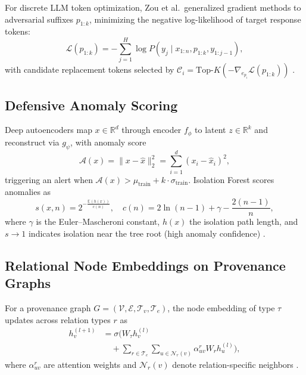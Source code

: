 \documentclass[conference,10pt,twocolumn,a4paper]{IEEEtran}
\begin{document}
For discrete LLM token optimization, Zou et al.\ generalized gradient methods to adversarial suffixes $p_{1:k}$, minimizing the negative log-likelihood of target response tokens:
\begin{equation}
\mathcal{L}(p_{1:k}) = -\sum_{j=1}^{H} \log P\left(y_j \mid x_{1:n}, p_{1:k}, y_{1:j-1}\right),
\end{equation}
with candidate replacement tokens selected by $\mathcal{C}_i = \mathrm{Top}\text{-}K(-\nabla_{e_{p_i}} \mathcal{L}(p_{1:k}))$ \cite{zou2023universal}.

\subsection{Defensive Anomaly Scoring}
Deep autoencoders map $x \in \mathbb{R}^d$ through encoder $f_\phi$ to latent $z \in \mathbb{R}^k$ and reconstruct via $g_\psi$, with anomaly score
\begin{equation}
\mathcal{A}(x) = \|x - \hat{x}\|_2^2 = \sum_{i=1}^{d} (x_i - \hat{x}_i)^2,
\end{equation}
triggering an alert when $\mathcal{A}(x) > \mu_{\mathrm{train}} + k \cdot \sigma_{\mathrm{train}}$. Isolation Forest scores anomalies as
\begin{equation}
s(x, n) = 2^{-\frac{\mathbb{E}(h(x))}{c(n)}}, \quad c(n) = 2\ln(n-1) + \gamma - \frac{2(n-1)}{n},
\end{equation}
where $\gamma$ is the Euler--Mascheroni constant, $h(x)$ the isolation path length, and $s \to 1$ indicates isolation near the tree root (high anomaly confidence) \cite{mirsky2018kitsune}.

\subsection{Relational Node Embeddings on Provenance Graphs}
For a provenance graph $G = (\mathcal{V}, \mathcal{E}, \mathcal{T}_v, \mathcal{T}_e)$, the node embedding of type $\tau$ updates across relation types $r$ as
\begin{equation}
\begin{split}
h_v^{(l+1)} &= \sigma \Big( W_\tau h_v^{(l)} \\
&\quad + \sum_{r \in \mathcal{T}_e} \sum_{u \in \mathcal{N}_r(v)} \alpha_{uv}^{r} W_r h_u^{(l)} \Big),
\end{split}
\end{equation}
where $\alpha_{uv}^{r}$ are attention weights and $\mathcal{N}_r(v)$ denote relation-specific neighbors \cite{jiang2024provenance}.
\end{document}
